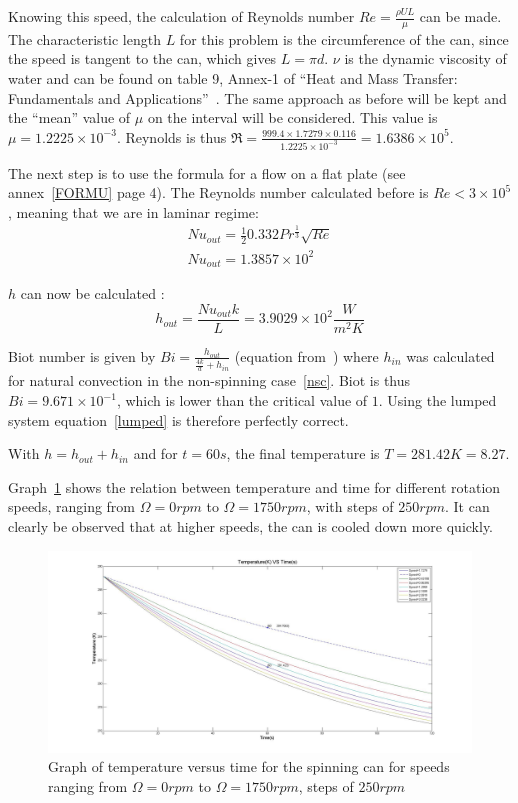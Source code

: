 \documentclass{report}
\begin{document}
	Knowing this speed, the calculation of Reynolds number $Re=\frac{\rho U L}{\mu}$ can be made. The characteristic length $L$ for this problem is the circumference of the can, since the speed is tangent to the can, which gives $L=\pi d$. $\nu$ is the dynamic viscosity of water and can be found on table 9, Annex-1 of ``Heat and Mass Transfer: Fundamentals and Applications''~\cite{HaMT}. The same approach as before will be kept and the ``mean'' value of $\mu$ on the interval will be considered. This value is $\mu=1.2225\times 10^{-3}$. Reynolds is thus $\Re= \frac{999.4 \times 1.7279 \times 0.116}{1.2225\times 10^{-3}}= 1.6386 \times 10^5$.
	
	The next step is to use the formula for a flow on a flat plate (see annex~\ref{FORMU} page 4). The Reynolds number calculated before is $Re<3\times 10^5$, meaning that we are in laminar regime:
	\begin{equation}
		\begin{gathered}
			Nu_{out}= \frac{1}{2}0.332Pr^{\frac{1}{3}}\sqrt{Re}\\
			Nu_{out}=1.3857\times 10^2
		\end{gathered}
	\end{equation}
	
	$h$ can now be calculated :
	\begin{equation}
		h_{out}=\frac{Nu_{out}k}{L}=3.9029\times 10^2 \frac{W}{m^2K}
	\end{equation}
	
	Biot number is given by $Bi=\frac{h_{out}}{{\frac{4k}{d}+h_{in}}}$ (equation from~\cite{MIT}) where $h_{in}$ was calculated for natural convection in the non-spinning case~\ref{nsc}. Biot is thus $Bi=9.671\times 10^{-1}$, which is lower than the critical value of $1$. Using the lumped system equation~\ref{lumped} is therefore perfectly correct.
	
	With $h=h_{out}+h_{in}$ and for $t=60s$, the final temperature is $T=281.42K=8.27$\textcelsius.
	
	Graph~\ref{Sg} shows the relation between temperature and time for different rotation speeds, ranging from $\Omega=0rpm$ to $\Omega=1750rpm$, with steps of $250rpm$. It can clearly be observed that at higher speeds, the can is cooled down more quickly.
	
	\begin{figure}
		\centering
		\includegraphics[width=\textwidth]{img/Sg.jpg}
		\caption{Graph of temperature versus time for the spinning can for speeds ranging from $\Omega=0rpm$ to $\Omega=1750rpm$, steps of $250rpm$}
		\label{Sg}
	\end{figure}
	
\end{document}
